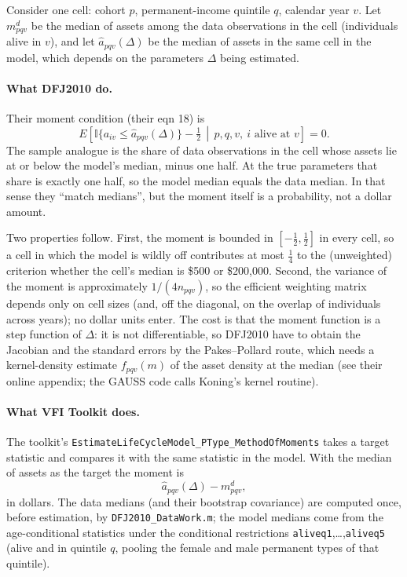 \documentclass[11pt,fleqn]{article}
\begin{document}
Consider one cell: cohort $p$, permanent-income quintile $q$, calendar year $v$. Let $m^d_{pqv}$ be the median of assets among the data observations in the cell (individuals alive in $v$), and let $\hat{a}_{pqv}(\Delta)$ be the median of assets in the same cell in the model, which depends on the parameters $\Delta$ being estimated.

\paragraph{What DFJ2010 do.}
Their moment condition (their eqn 18) is
\begin{equation*}
 E\left[ \mathbb{I}\{a_{iv} \leq \hat{a}_{pqv}(\Delta)\} - \tfrac{1}{2} \,\middle|\, p,q,v,\ i \text{ alive at } v \right] = 0 .
\end{equation*}
The sample analogue is the share of data observations in the cell whose assets lie at or below the model's median, minus one half. At the true parameters that share is exactly one half, so the model median equals the data median. In that sense they ``match medians'', but the moment itself is a probability, not a dollar amount.

Two properties follow. First, the moment is bounded in $[-\tfrac{1}{2},\tfrac{1}{2}]$ in every cell, so a cell in which the model is wildly off contributes at most $\tfrac{1}{4}$ to the (unweighted) criterion whether the cell's median is \$500 or \$200,000. Second, the variance of the moment is approximately $1/(4 n_{pqv})$, so the efficient weighting matrix depends only on cell sizes (and, off the diagonal, on the overlap of individuals across years); no dollar units enter. The cost is that the moment function is a step function of $\Delta$: it is not differentiable, so DFJ2010 have to obtain the Jacobian and the standard errors by the Pakes--Pollard route, which needs a kernel-density estimate $f_{pqv}(m)$ of the asset density at the median (see their online appendix; the GAUSS code calls Koning's kernel routine).

\paragraph{What VFI Toolkit does.}
The toolkit's \texttt{EstimateLifeCycleModel\_PType\_MethodOfMoments} takes a target statistic and compares it with the same statistic in the model. With the median of assets as the target the moment is
\begin{equation*}
 \hat{a}_{pqv}(\Delta) - m^d_{pqv} ,
\end{equation*}
in dollars. The data medians (and their bootstrap covariance) are computed once, before estimation, by \texttt{DFJ2010\_DataWork.m}; the model medians come from the age-conditional statistics under the conditional restrictions \texttt{aliveq1},\dots,\texttt{aliveq5} (alive and in quintile $q$, pooling the female and male permanent types of that quintile).
\end{document}
